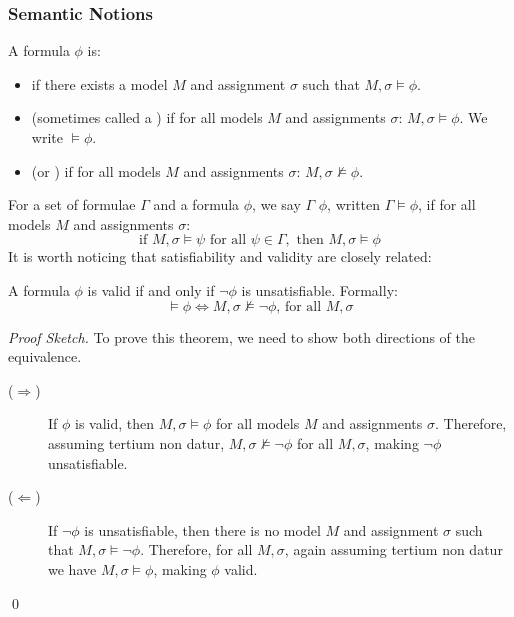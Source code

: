 \subsubsection{Semantic Notions}\label{subsubsec:semantic_notions}
A formula \(\phi\) is:
\begin{itemize}
  \item {} if there exists a model \(M\) and assignment \(\sigma\) such that \(M, \sigma \models \phi\).
  \item {} (sometimes called a ) if for all models \(M\) and assignments \(\sigma\): \(M, \sigma \models \phi\). We write \(\models \phi\).
  \item {} (or ) if for all models \(M\) and assignments \(\sigma\): \(M, \sigma \not\models \phi\).
\end{itemize}

For a set of formulae \(\Gamma\) and a formula \(\phi\), we say \(\Gamma\)  \(\phi\), written \(\Gamma \models \phi\), if for all models \(M\) and assignments \(\sigma\):
  \[\text{if } M, \sigma \models \psi \text{ for all } \psi \in \Gamma, \text{ then } M, \sigma \models \phi\]
It is worth noticing that satisfiability and validity are closely related:
\begin{theorem}\label{thm:validity_satisfiability_reduction}
A formula \(\phi\) is valid if and only if \(\neg\phi\) is unsatisfiable. Formally:
\[\models \phi \iff M,\sigma\not\models\neg\phi \text{, for all } M,\sigma\]
\end{theorem}

\begin{proof}[Proof Sketch]
To prove this theorem, we need to show both directions of the equivalence.
  \begin{description}
    \item[(\(\Rightarrow\))] If \(\phi\) is valid, then \(M, \sigma \models \phi\) for all models \(M\) and assignments \(\sigma\). Therefore, assuming tertium non datur, \(M, \sigma \not\models \neg\phi\) for all \(M, \sigma\), making \(\neg\phi\) unsatisfiable.
    \item[(\(\Leftarrow\))] If \(\neg\phi\) is unsatisfiable, then there is no model \(M\) and assignment \(\sigma\) such that \(M, \sigma \models \neg\phi\). Therefore, for all \(M, \sigma\), again assuming tertium non datur we have \(M, \sigma \models \phi\), making \(\phi\) valid.
  \end{description}
\qed{}
\end{proof}


